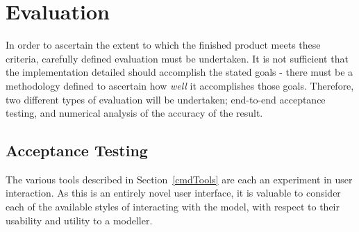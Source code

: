 \documentclass[a4paper,10pt]{article}
\begin{document}
\clearpage

\section{Evaluation}
In order to ascertain the extent to which the finished product meets these criteria, carefully defined evaluation must be undertaken. It is not sufficient that the implementation detailed should accomplish the stated goals - there must be a methodology defined to ascertain how \textit{well} it accomplishes those goals. Therefore, two different types of evaluation will be undertaken; end-to-end acceptance testing, and numerical analysis of the accuracy of the result.

\subsection{Acceptance Testing}
The various tools described in Section~\ref{cmdTools} are each an experiment in user interaction. As this is an entirely novel user interface, it is valuable to consider each of the available styles of interacting with the model, with respect to their usability and utility to a modeller.
\end{document}
